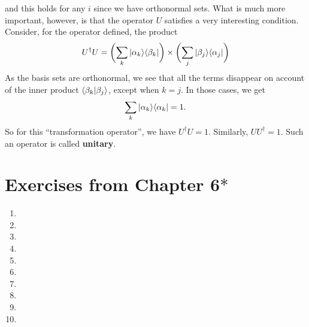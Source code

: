 and this holds for any $i$ since we have orthonormal sets. What is much more important, however, is that the operator $U$ satisfies a very interesting condition. Consider, for the operator defined, the product
$$
U^\dagger U=\biggl(\sum_{k}|\alpha_{k}\rangle\langle\beta_{k}|\biggr)\times\biggl(\sum_{j}|\beta_{j}\rangle\langle\alpha_{j}|\biggr)
$$
As the basis sets are orthonormal, we see that all the terms disappear on account of the inner product $\langle\beta_{k}|\beta_{j}\rangle$, except when $k=j$. In those cases, we get 
$$
\sum_{k}|\alpha_{k}\rangle\langle\alpha_{k}|=1.
$$
So for this ``transformation operator'', we have $U^{\dagger}U=1$. Similarly, $U U^{\dagger}=1$. Such an operator is called \textbf{unitary}. 
\section{Exercises from Chapter 6$\ast$}
\begin{enumerate}
    \item 
    \item
    \item
    \item
    \item
    \item
    \item
    \item
    \item
    \item
\end{enumerate}